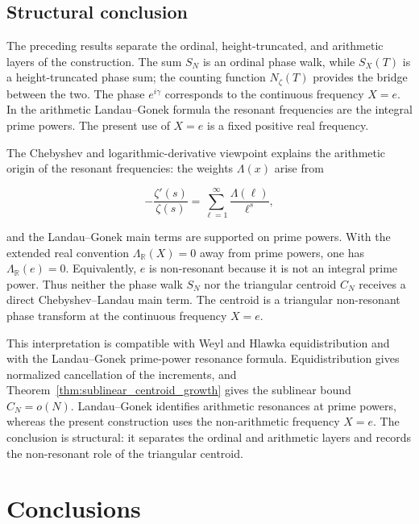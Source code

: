 \documentclass[11pt]{amsart}
\numberwithin{equation}{section}
\theoremstyle{plain}
\theoremstyle{definition}
\theoremstyle{remark}
\begin{document}
\subsection{Structural conclusion}
\label{subsec:structural_conclusion_non_resonant}

The preceding results separate the ordinal, height-truncated, and
arithmetic layers of the construction. The sum \(S_N\) is an ordinal
phase walk, while \(S_X(T)\) is a height-truncated phase sum; the counting
function \(N_\zeta(T)\) provides the bridge between the two. The phase
\(e^{i\gamma}\) corresponds to the continuous frequency \(X=e\). In the
arithmetic Landau--Gonek formula the resonant frequencies are the
integral prime powers. The present use of \(X=e\) is a fixed positive
real frequency.

The Chebyshev and logarithmic-derivative viewpoint explains the
arithmetic origin of the resonant frequencies: the weights \(\Lambda(x)\)
arise from

\begin{equation}
-\frac{\zeta'(s)}{\zeta(s)}
=
\sum_{\ell=1}^{\infty}\frac{\Lambda(\ell)}{\ell^s},
\label{eq:structural_conclusion_log_derivative_bridge}
\end{equation}

and the Landau--Gonek main terms are supported on prime powers. With the
extended real convention \(\Lambda_{\mathbb R}(X)=0\) away from prime
powers, one has \(\Lambda_{\mathbb R}(e)=0\). Equivalently, \(e\) is
non-resonant because it is not an integral prime power. Thus neither the
phase walk \(S_N\) nor the triangular centroid \(C_N\) receives a direct
Chebyshev--Landau main term. The centroid is a triangular non-resonant
phase transform at the continuous frequency \(X=e\).

This interpretation is compatible with Weyl and Hlawka
equidistribution and with the Landau--Gonek prime-power resonance
formula. Equidistribution gives normalized cancellation of the
increments, and Theorem~\ref{thm:sublinear_centroid_growth} gives the
sublinear bound \(C_N=o(N)\). Landau--Gonek identifies arithmetic
resonances at prime powers, whereas the present construction uses the
non-arithmetic frequency \(X=e\). The conclusion is structural: it
separates the ordinal and arithmetic layers and records the
non-resonant role of the triangular centroid.

\section{Conclusions}
\label{sec:conclusions}
\end{document}
